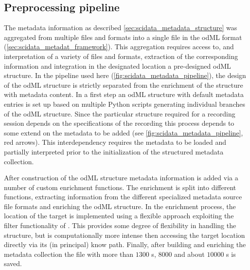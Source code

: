 \subsection{Preprocessing pipeline}
The metadata information as described \cref{sec:scidata_metadata_structure} was aggregated from multiple files and formats into a single file in the odML format (\cref{sec:scidata_metadat_framework}). This aggregation requires access to, and interpretation of a variety of files and formats, extraction of the corresponding information and integration in the designated location a pre-designed odML structure. In the pipeline used here (\cref{fig:scidata_metadata_pipeline}), the design of the odML structure is strictly separated from the enrichment of the structure with metadata content. In a first step an odML structure with default metadata entries is set up based on multiple Python scripts generating individual branches of the odML structure. Since the particular structure required for a recording session depends on the specifications of the recording this process depends to some extend on the metadata to be added (see \cref{fig:scidata_metadata_pipeline}, red arrows). This interdependency requires the metadata to be loaded and partially interpreted prior to the initialization of the structured metadata collection.

After construction of the odML structure metadata information is added via a number of custom enrichment functions. The enrichment is split into different functions, extracting information from the different specialized metadata source file formats and enriching the odML structure. In the enrichment process, the location of the target  is implemented using a flexible approach exploiting the filter functionality of . This provides some degree of flexibility in handling the  structure, but is computationally more intense then accessing the target location directly via its (in principal) know path. Finally, after building and enriching the metadata collection the  file with more than $1300$ s, $8000$  and about $10000$ s is saved.

